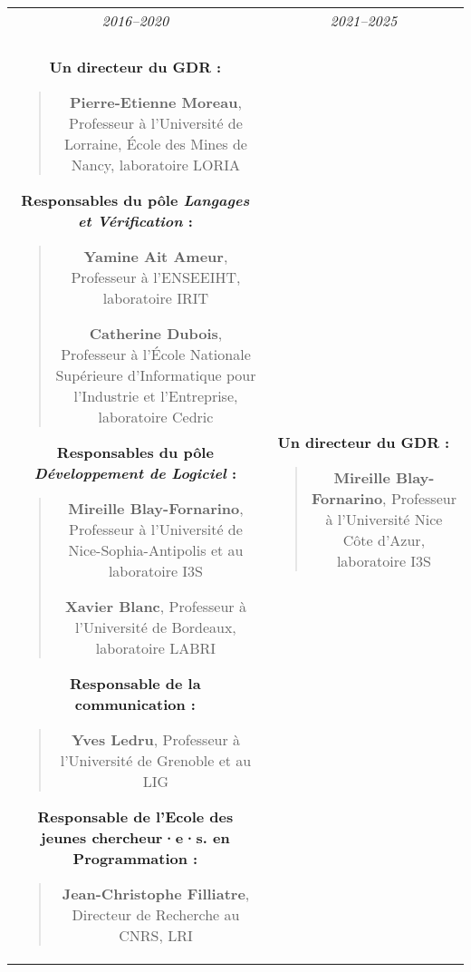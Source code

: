 \documentclass[11pt]{article}
\begin{document}
\begin{small}
\begin{center}
\begin{tabular}{c|c}
  \textit{2016--2020} & \textit{2021--2025}\\
  \\

\hspace*{0.2cm}
\begin{minipage}[t]{.5\textwidth}
  \textbf{Un directeur du GDR :}
  \begin{quote}
    \textbf{Pierre-Etienne Moreau},
  Professeur à l'Université de Lorraine, École des
        Mines de Nancy, laboratoire LORIA
  \end{quote}
  \textbf{Responsables du pôle \textit{Langages et Vérification} :}
  \begin{quote}
    \textbf{Yamine Ait Ameur}, Professeur à l'ENSEEIHT, laboratoire IRIT

    \textbf{Catherine Dubois}, Professeur à l'École Nationale Supérieure d'Informatique pour l'Industrie et l'Entreprise, laboratoire Cedric
  \end{quote}

  \textbf{Responsables du pôle \textit{Développement de Logiciel} :}
  \begin{quote}
    \textbf{Mireille Blay-Fornarino}, Professeur à l'Université de Nice-Sophia-Antipolis et au laboratoire I3S

    \textbf{Xavier Blanc}, Professeur à l'Université de Bordeaux, laboratoire LABRI
\end{quote}

\textbf{Responsable de la communication :}
\begin{quote}
  \textbf{Yves Ledru}, Professeur à l'Université de Grenoble et au LIG
\end{quote}

\textbf{Responsable de l'Ecole des jeunes chercheur·e·s. en Programmation :}
\begin{quote}
  \textbf{Jean-Christophe Filliatre}, Directeur de Recherche au CNRS,  LRI
\end{quote}
\end{minipage}
&
\begin{minipage}[t]{.5\textwidth}
\textbf{Un directeur du GDR :}
  \begin{quote}
    \textbf{Mireille Blay-Fornarino}, Professeur à l'Université Nice Côte d'Azur, laboratoire I3S
  \end{quote}


\end{minipage}
\end{tabular}
\end{center}
\end{small}
\end{document}
